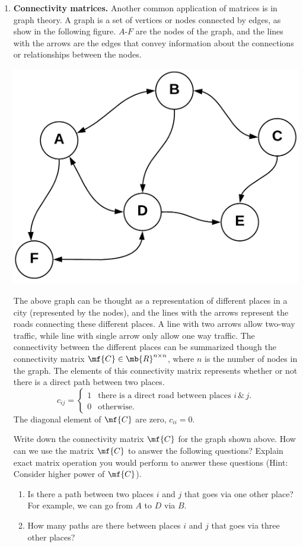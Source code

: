 \begin{enumerate}
    \item \textbf{Connectivity matrices.} Another common application of matrices is in graph theory. A graph is a set of vertices or nodes connected by edges, as show in the following figure. $A$-$F$ are the nodes of the graph, and the lines with the arrows are the edges that convey information about the connections or relationships between the nodes.
    \begin{center}
        \includegraphics[width=0.5\columnwidth]{figure/chapter03/graph.png}
    \end{center}
    The above graph can be thought as a representation of different places in a city (represented by the nodes), and the lines with the arrows represent the roads connecting these different places. A line with two arrows allow two-way traffic, while line with single arrow only allow one way traffic. The connectivity between the different places can be summarized though the connectivity matrix $\mf{C} \in \mb{R}^{n \times n}$, where $n$ is the number of nodes in the graph. The elements of this connectivity matrix  represents whether or not there is a direct path between two places.
    \[ 
    c_{ij} = \begin{cases}
        1 & \text{there is a direct road between places } i \, \& \,j. \\
        0 & \text{otherwise.}
    \end{cases}
    \]
    The diagonal element of $\mf{C}$ are zero, $c_{ii} = 0$.
    
    Write down the connectivity matrix $\mf{C}$ for the graph shown above. How can we use the matrix $\mf{C}$ to answer the following questions? Explain exact matrix operation you would perform to answer these questions (Hint: Consider higher power of $\mf{C}$).
    \begin{enumerate}
        \item Is there a path between two places $i$ and $j$ that goes via one other place? For example, we can go from $A$ to $D$ via $B$.
        \item How many paths are there between places $i$ and $j$ that goes via three other places?
    \end{enumerate}
    

\end{enumerate}
